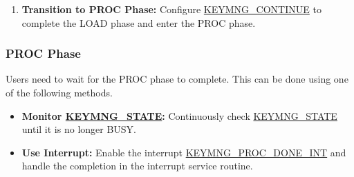 \documentclass[main\_\_EN.tex]{subfiles}
\begin{document}
\begin{enumerate}
\begin{itemize}
\begin{enumerate}
            \item Write \begin{math}k1*G\end{math} (512 bits) into \hyperref[mem:keymng-public-info]{KEYMNG\_PUBLIC\_INFO\_MEM}.
        \end{enumerate}
        \item \textbf{Private Key Recovery Mode:}
        \begin{enumerate}
            \item Write \hyperref[para:keyinfo]{\begin{math}key\_info\end{math}} (512 bits) into \hyperref[mem:keymng-assist-info]{KEYMNG\_ASSIST\_INFO\_MEM}.
        \end{enumerate}
        \item \textbf{\hyperref[para:keyinfo]{\begin{math}key\_info\end{math}} Export Mode:} No additional configuration is required.
    \end{itemize}
    \item \textbf{Transition to PROC Phase:}  Configure \hyperref[fielddesc:KEYMNGCONTINUE]{KEYMNG\_CONTINUE} to complete the LOAD phase and enter the PROC phase.
\end{enumerate}


\subsubsection{PROC Phase}
Users need to wait for the PROC phase to complete. This can be done using one of the following methods.
\begin{itemize}
    \item \textbf{Monitor \hyperref[fielddesc:KEYMNGSTATE]{KEYMNG\_STATE}:} Continuously check \hyperref[fielddesc:KEYMNGSTATE]{KEYMNG\_STATE} until it is no longer BUSY.
    \item \textbf{Use Interrupt:} Enable the interrupt \hyperref[int:KEYMNGPROCDONEINT]{KEYMNG\_PROC\_DONE\_INT} and handle the completion in the interrupt service routine.
\end{itemize}
\end{document}
